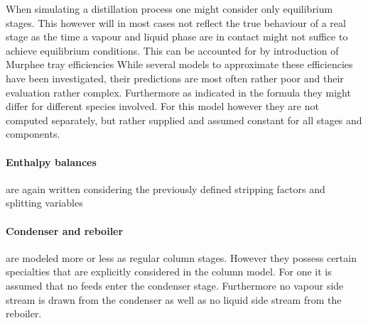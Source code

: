        When simulating a distillation process one might consider only equilibrium stages. This however
        will in most cases not reflect the true behaviour of a real stage as the time a vapour and
        liquid phase are in contact might not suffice to achieve equilibrium conditions. This can be
        accounted for by introduction of Murphee tray efficiencies \cite{Henley.op.2011}
        While several models to approximate these efficiencies have been investigated, their predictions are
        most often rather poor \cite{Coulson.1999} and their evaluation rather complex. Furthermore as indicated
        in the formula they might differ for different species involved. For this model however
        they are not computed separately, but rather supplied and assumed constant for all stages and components.

        \paragraph{Enthalpy balances} are again written considering the previously defined stripping factors
        and splitting variables
        \paragraph{Condenser and reboiler} are modeled more or less as regular column stages. However
        they possess certain specialties that are explicitly considered in the column model. For one it is assumed
        that no feeds enter the condenser stage. Furthermore no vapour side stream is drawn from the condenser as well as
        no liquid side stream from the reboiler.

